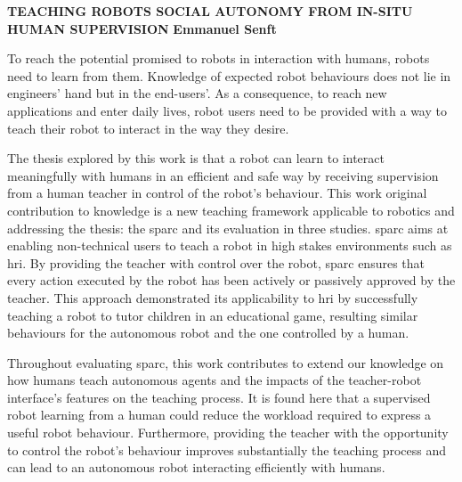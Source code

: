 \textbf{TEACHING ROBOTS SOCIAL AUTONOMY FROM IN-SITU HUMAN SUPERVISION}\newline
\textbf{Emmanuel Senft}

To reach the potential promised to robots in interaction with humans, robots need to learn from them. Knowledge of expected robot behaviours does not lie in engineers' hand but in the end-users'. As a consequence, to reach new applications and enter daily lives, robot users need to be provided with a way to teach their robot to interact in the way they desire.

The thesis explored by this work is that a robot can learn to interact meaningfully with humans in an efficient and safe way by receiving supervision from a human teacher in control of the robot's behaviour. This work original contribution to knowledge is a new teaching framework applicable to robotics and addressing the thesis: the \gls{sparc} and its evaluation in three studies. \gls{sparc} aims at enabling non-technical users to teach a robot in high stakes environments such as \gls{hri}. By providing the teacher with control over the robot, \gls{sparc} ensures that every action executed by the robot has been actively or passively approved by the teacher. This approach demonstrated its applicability to \gls{hri} by successfully teaching a robot to tutor children in an educational game, resulting similar behaviours for the autonomous robot and the one controlled by a human.

Throughout evaluating \gls{sparc}, this work contributes to extend our knowledge on how humans teach autonomous agents and the impacts of the teacher-robot interface's features on the teaching process. It is found here that a supervised robot learning from a human could reduce the workload required to express a useful robot behaviour. Furthermore, providing the teacher with the opportunity to control the robot's behaviour improves substantially the teaching process and can lead to an autonomous robot interacting efficiently with humans.





